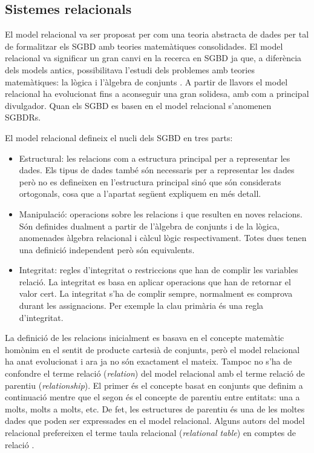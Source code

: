  


\subsection{Sistemes relacionals}
\label{sec:estat:sgbdr}

El model relacional va ser proposat per \textcite{codd69,codd70} com una
teoria abstracta de dades per tal de formalitzar els \gls{SGBD} amb teories
matemàtiques consolidades.  El model relacional va significar un gran
canvi en la recerca en \gls{SGBD} ja que, a diferència dels models antics,
possibilitava l'estudi dels problemes amb teories matemàtiques: la
lògica i l'àlgebra de
conjunts \parencite{atzeni13:relational_model_dead}.  A partir de
llavors el model relacional ha evolucionat fins a aconseguir una gran
solidesa, amb \textcite{date04:introduction8,date06,date:dictionary} com
a principal divulgador.  Quan els \gls{SGBD} es basen en el model relacional
s'anomenen \glspl{SGBDR}.



El model relacional defineix el nucli dels \gls{SGBD} en tres parts:
\begin{itemize}
\item Estructural: les relacions com a estructura principal per a
  representar les dades. Els tipus de dades també són necessaris per a
  representar les dades però no es defineixen en l'estructura
  principal sinó que són considerats ortogonals, cosa que a l'apartat
  següent expliquem en més detall.

\item Manipulació: operacions sobre les relacions i que resulten en
  noves relacions. Són definides dualment a partir de l'àlgebra de
  conjunts i de la lògica, anomenades àlgebra relacional i càlcul
  lògic respectivament. Totes dues tenen una definició independent
  però són equivalents.

\item Integritat: regles d'integritat o restriccions que han de
  complir les variables relació. La integritat es basa en aplicar
  operacions que han de retornar el valor cert. La integritat s'ha de
  complir sempre, normalment es comprova durant les assignacions.  Per
  exemple la clau primària \parencite{date04:introduction8} és una
  regla d'integritat.
\end{itemize}


La definició de les relacions inicialment es basava en el concepte
matemàtic homònim en el sentit de producte cartesià de conjunts, però
el model relacional ha anat evolucionat i ara ja no són exactament el
mateix. Tampoc no s'ha de confondre el terme relació (\emph{relation})
del model relacional amb el terme relació de parentiu
(\emph{relationship}). El primer és el concepte basat en conjunts que
definim a continuació mentre que el segon és el concepte de parentiu
entre entitats: una a molts, molts a molts, etc. De fet, les
estructures de parentiu és una de les moltes dades que poden ser
expressades en el model relacional. Alguns autors del model relacional
prefereixen el terme taula relacional (\emph{relational table}) en
comptes de relació \parencite{dbdebunk}.



